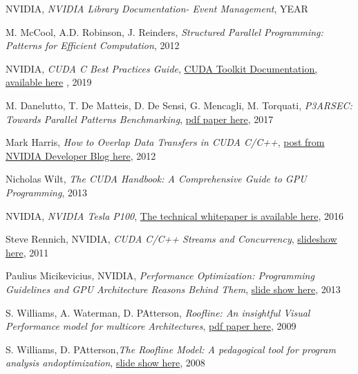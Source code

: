 \documentclass[12pt]{report}
\begin{document}
\begin{thebibliography}{9}
		NVIDIA, \textit{NVIDIA Library Documentation- Event Management}, YEAR
		
		M. McCool, A.D. Robinson, J. Reinders, \textit{Structured Parallel Programming: Patterns for Efficient Computation}, 2012
		
		NVIDIA, \textit{CUDA C Best Practices Guide}, \href{https://docs.nvidia.com/cuda/cuda-c-best-practices-guide/index.html}{CUDA Toolkit Documentation, available here} , 2019
		
		M. Danelutto, T. De Matteis, D. De Sensi, G. Mencagli, M. Torquati, \textit{P3ARSEC: Towards Parallel Patterns Benchmarking}, \href{http://pages.di.unipi.it/desensi/assets/pdf/2017\_SAC.pdf}{pdf paper here}, 2017
		
		Mark Harris, \textit{How to Overlap Data Transfers in CUDA C/C++}, \href{https://devblogs.nvidia.com/how-overlap-data-transfers-cuda-cc/}{post from NVIDIA Developer Blog here}, 2012
		
		Nicholas Wilt, \textit{The CUDA Handbook: A Comprehensive Guide to GPU Programming}, 2013
		
		
		NVIDIA, \textit{NVIDIA Tesla P100}, \href{https://images.nvidia.com/content/pdf/tesla/whitepaper/pascal-architecture-whitepaper.pdf}{The technical whitepaper is available here}, 2016
		
		
		Steve Rennich, NVIDIA, \textit{CUDA C/C++ Streams and Concurrency}, 		\href{https://developer.download.nvidia.com/CUDA/training/\\
			StreamsAndConcurrencyWebinar.pdf}{slideshow here}, 2011
		
		
		Paulius Micikevicius, NVIDIA, \textit{Performance Optimization: Programming Guidelines and GPU Architecture Reasons Behind Them}, \href{http://on-demand.gputechconf.com/gtc/2013/presentations/S3466-Programming-Guidelines-GPU-Architecture.pdf}{slide show here}, 2013
		
		S. Williams, A. Waterman, D. PAtterson, \textit{Roofline:  An insightful Visual Performance model for multicore Architectures}, \href{http://citeseerx.ist.psu.edu/viewdoc/download?doi=10.1.1.156.756\&rep=rep1\&type=pdf}{pdf paper here}, 2009
		
		S. Williams, D. PAtterson,\textit{The Roofline Model: A pedagogical tool for program analysis andoptimization}, \href{https://crd.lbl.gov/assets/pubs\_presos/parlab08-roofline-talk.pdf}{slide show here}, 2008
		

\end{thebibliography}
\end{document}
